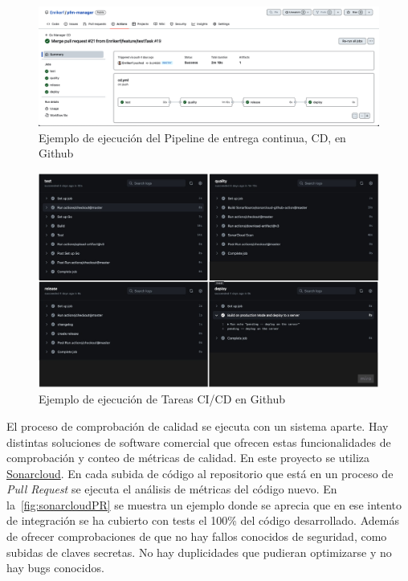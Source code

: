 \begin{figure}[H]
    \centering
    \includegraphics[height=0.23\textheight]{./part/Ejecucion/Seguimiento/PuestaAPunto/img/CD pipeline release}
    \caption{Ejemplo de ejecución del Pipeline de entrega continua, CD, en Github}\label{fig:cd}
\end{figure}

\begin{figure}[H]
    \centering
    \includegraphics[height=0.43\textheight]{./part/Ejecucion/Seguimiento/PuestaAPunto/img/PFM - fullpipeline}
    \caption{Ejemplo de ejecución de Tareas CI/CD en Github}\label{fig:tasks}
\end{figure}

El proceso de comprobación de calidad se ejecuta con un sistema aparte.
Hay distintas soluciones de software comercial que ofrecen estas funcionalidades de comprobación y conteo de métricas de calidad.
En este proyecto se utiliza \href{https://sonarcloud.io/project/overview?id=Enrikerf_pfm-manager}{Sonarcloud}.
En cada subida de código al repositorio que está en un proceso de \textit{Pull Request} se ejecuta el análisis de métricas del código nuevo.
En la~\cref{fig:sonarcloudPR} se muestra un ejemplo donde se aprecia que en ese intento de integración se ha cubierto con tests el 100\% del código desarrollado.
Además de ofrecer comprobaciones de que no hay fallos conocidos de seguridad, como subidas de claves secretas.
No hay duplicidades que pudieran optimizarse y no hay bugs conocidos.


